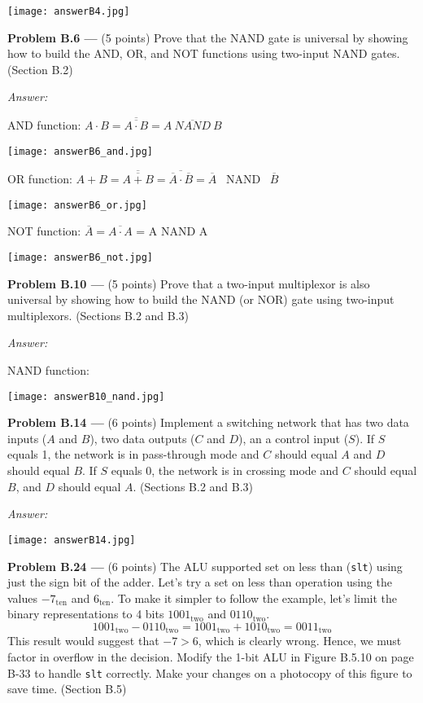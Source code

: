 \documentclass[11pt]{article}
\newcommand{\problem}[1]{\textbf{Problem #1 ---} }
\newcommand{\answer}{{\color{red}\textit{Answer: }}}
\begin{document}
\texttt{[image: answerB4.jpg]}

\problem{B.6}(5 points) Prove that the NAND gate is universal by showing how to build the AND, OR, and NOT functions using two-input NAND gates. (Section B.2)

\answer

AND function: $A\cdot B = \overline{\overline{A \cdot B}} 
                        = \overline{A\  NAND \ B}$

\texttt{[image: answerB6\_and.jpg]}

OR function: $A + B = \overline{\overline{A + B}}
                    = \overline{\overline{A} \cdot \overline{B}}
                    = \overline{A}$ \ NAND \ $\overline{B}$

\texttt{[image: answerB6\_or.jpg]}

NOT function: $\overline{A} = \overline{A \cdot A}$
                            = A NAND A

\texttt{[image: answerB6\_not.jpg]}

\problem{B.10}(5 points) Prove that a two-input multiplexor is also universal by showing how to build the NAND (or NOR) gate using two-input multiplexors. (Sections B.2 and B.3)

\answer

NAND function:

\texttt{[image: answerB10\_nand.jpg]}

\newpage                       

\problem{B.14}(6 points) Implement a switching network that has two data inputs ($A$ and $B$), two data outputs ($C$ and $D$), an a control input ($S$).  If $S$ equals 1, the network is in pass-through mode and $C$ should equal $A$ and $D$ should equal $B$.  If $S$ equals $0$, the network is in crossing mode and $C$ should equal $B$, and $D$ should equal $A$. (Sections B.2 and B.3)

\answer

\texttt{[image: answerB14.jpg]}

\newpage

\problem{B.24}(6 points) The ALU supported set on less than (\texttt{slt}) using just the sign bit of the adder.  Let's try a set on less than operation using the values $-7_\text{ten}$ and $6_\text{ten}$.  To make it simpler to follow the example, let's limit the binary representations to 4 bits $1001_\text{two}$ and $0110_\text{two}$.
\[ 1001_\text{two} - 0110_\text{two} = 1001_\text{two} + 1010_\text{two} = 0011_\text{two} \]
This result would suggest that $-7 > 6$, which is clearly wrong.  Hence, we must factor in overflow in the decision.  Modify the 1-bit ALU in Figure B.5.10 on page B-33 to handle \texttt{slt} correctly.  Make your changes on a photocopy of this figure to save time. (Section B.5)
\end{document}
